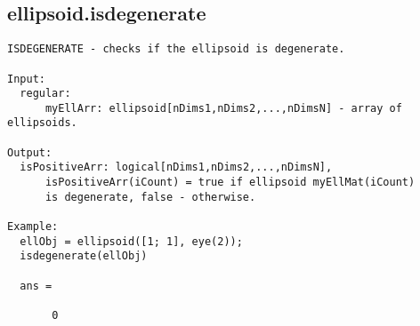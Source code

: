 \subsection{\texorpdfstring{ellipsoid.isdegenerate}{isdegenerate}}\label{method:ellipsoid.isdegenerate}
\begin{verbatim}
ISDEGENERATE - checks if the ellipsoid is degenerate.

Input:
  regular:
      myEllArr: ellipsoid[nDims1,nDims2,...,nDimsN] - array of ellipsoids.

Output:
  isPositiveArr: logical[nDims1,nDims2,...,nDimsN],
      isPositiveArr(iCount) = true if ellipsoid myEllMat(iCount)
      is degenerate, false - otherwise.

Example:
  ellObj = ellipsoid([1; 1], eye(2));
  isdegenerate(ellObj)

  ans =

       0
\end{verbatim}
